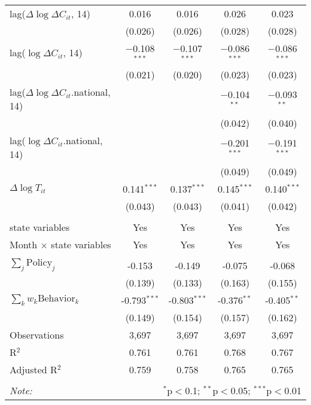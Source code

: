 \begin{tabular}{@{\extracolsep{1pt}}lcccc}
  lag($\Delta \log \Delta C_{it}$, 14) & 0.016 & 0.016 & 0.026 & 0.023 \\ 
  & (0.026) & (0.026) & (0.028) & (0.028) \\ 
  lag($\log \Delta C_{it}$, 14) & $-$0.108$^{***}$ & $-$0.107$^{***}$ & $-$0.086$^{***}$ & $-$0.086$^{***}$ \\ 
  & (0.021) & (0.020) & (0.023) & (0.023) \\ 
  lag($\Delta \log \Delta C_{it}$.national, 14) &  &  & $-$0.104$^{**}$ & $-$0.093$^{**}$ \\ 
  &  &  & (0.042) & (0.040) \\ 
  lag($\log \Delta C_{it}$.national, 14) &  &  & $-$0.201$^{***}$ & $-$0.191$^{***}$ \\ 
  &  &  & (0.049) & (0.049) \\ 
  $\Delta \log T_{it}$ & 0.141$^{***}$ & 0.137$^{***}$ & 0.145$^{***}$ & 0.140$^{***}$ \\ 
  & (0.043) & (0.043) & (0.041) & (0.042) \\ 
 \hline \\[-1.8ex] 
state variables & Yes & Yes & Yes & Yes \\ 
Month $\times$ state variables & Yes & Yes & Yes & Yes \\ 
\hline \\[-1.8ex] 
$\sum_j \mathrm{Policy}_j$ & -0.153 & -0.149 & -0.075 & -0.068 \\ 
 & (0.139) & (0.133) & (0.163) & (0.155) \\ 
$\sum_k w_k \mathrm{Behavior}_k$ & -0.793$^{***}$ & -0.803$^{***}$ & -0.376$^{**}$ & -0.405$^{**}$ \\ 
 & (0.149) & (0.154) & (0.157) & (0.162) \\ 
Observations & 3,697 & 3,697 & 3,697 & 3,697 \\ 
R$^{2}$ & 0.761 & 0.761 & 0.768 & 0.767 \\ 
Adjusted R$^{2}$ & 0.759 & 0.758 & 0.765 & 0.765 \\ 
\hline 
\hline \\[-1.8ex] 
\textit{Note:}  & \multicolumn{4}{r}{$^{*}$p$<$0.1; $^{**}$p$<$0.05; $^{***}$p$<$0.01} \\ 
\end{tabular} 